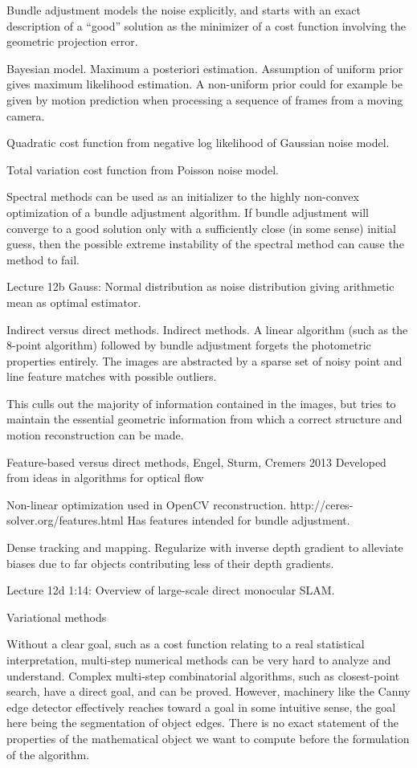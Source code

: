 \documentclass{article}
\begin{document}
Bundle adjustment models the noise explicitly, and starts with an exact description of a ``good'' solution as the
minimizer of a cost function involving the geometric projection error.

Bayesian model. Maximum a posteriori estimation. Assumption of uniform prior gives maximum likelihood estimation.
A non-uniform prior could for example be given by motion prediction when processing a sequence of frames from a moving camera.

Quadratic cost function from negative log likelihood of Gaussian noise model.

Total variation cost function from Poisson noise model.

Spectral methods can be used as an initializer to the highly non-convex optimization of a bundle adjustment algorithm.
If bundle adjustment will converge to a good solution only with a sufficiently close (in some sense) initial guess,
then the possible extreme instability of the spectral method can cause the method to fail.

Lecture 12b Gauss: Normal distribution as noise distribution giving arithmetic mean as optimal estimator.

Indirect versus direct methods.
Indirect methods. A linear algorithm (such as the 8-point algorithm) followed by bundle adjustment
forgets the photometric properties entirely. The images are abstracted by a sparse set of noisy point and line feature matches
with possible outliers.

This culls out the majority of information contained in the images, but tries to maintain the essential geometric
information from which a correct structure and motion reconstruction can be made.

Feature-based versus direct methods, Engel, Sturm, Cremers 2013
Developed from ideas in algorithms for optical flow

Non-linear optimization used in OpenCV reconstruction.
http://ceres-solver.org/features.html
Has features intended for bundle adjustment.

Dense tracking and mapping. Regularize with inverse depth gradient to alleviate biases due to far objects contributing
less of their depth gradients.

Lecture 12d 1:14: Overview of large-scale direct monocular SLAM.


Variational methods

Without a clear goal, such as a cost function relating to a real statistical interpretation, multi-step numerical methods
can be very hard to analyze and understand. Complex multi-step combinatorial algorithms, such as closest-point search, have
a direct goal, and can be proved. However, machinery like the Canny edge detector effectively reaches toward a goal in some intuitive sense,
the goal here being the segmentation of object edges. There is no exact statement of the properties of the mathematical object we want to compute
before the formulation of the algorithm.
\end{document}
